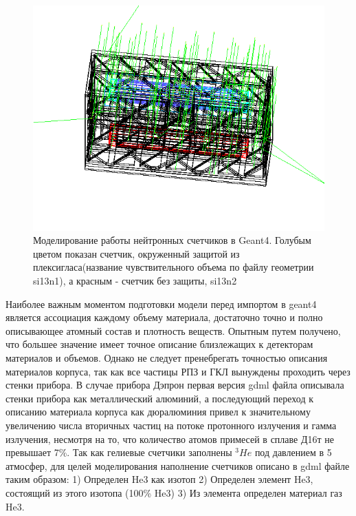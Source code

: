 \begin{figure}
	\centering
	\includegraphics[width=0.7\linewidth]{images/neutrons/neutron}
	\caption[Моделирование работы нейтронных счетчиков в Geant4.]{Моделирование работы нейтронных счетчиков в Geant4. Голубым цветом показан счетчик, окруженный защитой из плексигласа(название чувствительного объема по файлу геометрии si13n1), а красным - счетчик без защиты, si13n2}
	\label{fig:neutron}
\end{figure}

Наиболее важным моментом подготовки модели перед импортом в geant4 является ассоциация каждому объему материала, достаточно точно и полно описывающее атомный состав и плотность веществ. Опытным путем получено, что большее значение имеет точное описание близлежащих к детекторам материалов и объемов. Однако не следует пренебрегать точностью описания материалов корпуса, так как все частицы РПЗ и ГКЛ вынуждены проходить через стенки прибора. В случае прибора Дэпрон первая версия gdml файла описывала стенки прибора как металлический алюминий, а последующий переход к описанию материала корпуса как дюралюминия привел к значительному увеличению числа вторичных частиц на потоке протонного излучения и гамма излучения, несмотря на то, что количество атомов примесей в сплаве Д16т не превышает 7\%.
Так как гелиевые счетчики заполнены $ ^3\!He $ под давлением в 5 атмосфер, для целей моделирования наполнение счетчиков описано в gdml файле таким образом:
1) Определен He3 как изотоп 
2) Определен элемент He3, состоящий из этого изотопа (100\% He3) 
3) Из элемента определен материал газ He3.

